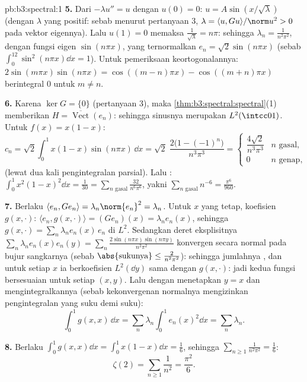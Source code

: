 \begin{solution}{pb:b3:spectral:1}
\textbf{5.} Dari $-\lambda u'' = u$ dengan $u(0) = 0$: $u = A\sin(x/\sqrt
\lambda)$ (dengan $\lambda$ yang positif: sebab menurut pertanyaan 3, $\lambda =
\langle u, Gu\rangle/\norm u^2 > 0$ pada vektor eigennya). Lalu $u(1) =
0$ memaksa $\frac1{\sqrt\lambda} = n\pi$: sehingga $\lambda_n =
\frac1{n^2\pi^2}$, dengan fungsi eigen $\sin(n\pi x)$, yang ternormalkan
$e_n = \sqrt2\sin(n\pi x)$ (sebab $\int_0^12\sin^2(n\pi x)\dd x =
1$). Untuk pemeriksaan keortogonalannya: $2\sin(m\pi x)\sin(n\pi x) =
\cos((m-n)\pi x) - \cos((m+n)\pi x)$ berintegral $0$ untuk $m
\neq n$.

\textbf{6.} Karena $\ker G = \{0\}$ (pertanyaan 3), maka
\cref{thm:b3:spectral:spectral}(1) memberikan $H =
\overline{\operatorname{Vect}}(e_n)$: sehingga sinusnya merupakan  $L^2(\intcc01)$. Untuk $f(x) = x(1 - x)$:
\[
c_n = \sqrt2\int_0^1x(1-x)\sin(n\pi x)\,\dd x
= \sqrt2\;\frac{2\bigl(1 - (-1)^n\bigr)}{n^3\pi^3}
= \begin{cases}\dfrac{4\sqrt2}{n^3\pi^3} & n \text{ gasal},\\
0 & n \text{ genap},\end{cases}
\]
(lewat dua kali pengintegralan parsial). Lalu : $\int_0^1x^2(1-x)^2\dd
x = \frac1{30} = \sum_{n \text{ gasal}}\frac{32}{n^6\pi^6}$,
yakni $\sum_{n\text{ gasal}}n^{-6} = \frac{\pi^6}{960}$.

\textbf{7.} Berlaku $\langle e_n, Ge_n\rangle = \lambda_n\norm{e_n}^2
= \lambda_n$. Untuk $x$ yang tetap, koefisien $g(x,
\cdot)$: $\langle e_n, g(x,\cdot)\rangle = (Ge_n)(x) =
\lambda_ne_n(x)$, sehingga $g(x,\cdot) =
\sum_n\lambda_ne_n(x)\,e_n$ di $L^2$. Sedangkan deret eksplisitnya
$\sum_n\lambda_ne_n(x)e_n(y) = \sum_n\frac{2\sin(n\pi
x)\sin(n\pi y)}{n^2\pi^2}$ konvergen secara normal pada bujur sangkarnya
(sebab $\abs{\text{sukunya}} \leq \frac2{n^2\pi^2}$): sehingga jumlahnya
, dan untuk setiap $x$ ia berkoefisien
$L^2(\dd y)$ sama dengan $g(x, \cdot)$: jadi kedua fungsi 
bersesuaian untuk setiap $(x, y)$. Lalu dengan menetapkan $y = x$ dan
mengintegralkannya (sebab kekonvergenan normalnya mengizinkan pengintegralan yang suku demi suku):
\[
\int_0^1g(x,x)\,\dd x =
\sum_n\lambda_n\int_0^1e_n(x)^2\dd x = \sum_n\lambda_n .
\]

\textbf{8.} Berlaku $\int_0^1g(x,x)\dd x = \int_0^1x(1 - x)\dd x =
\frac16$, sehingga $\sum_{n\geq1}\frac1{n^2\pi^2} = \frac16$:
\[
\zeta(2) = \sum_{n\geq1}\frac1{n^2} = \frac{\pi^2}6 .
\]


\end{solution}
